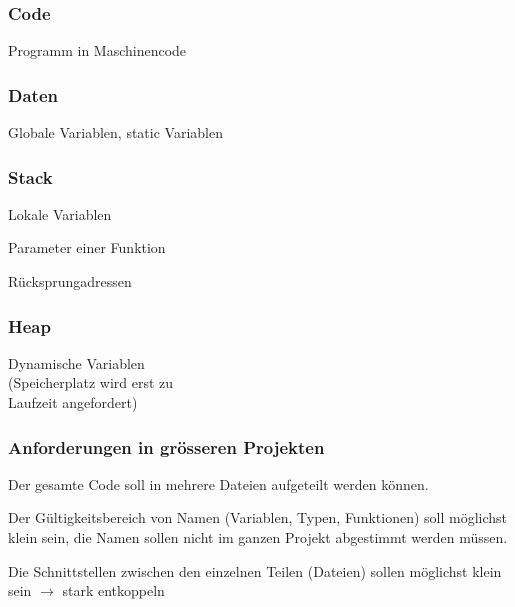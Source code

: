 		\hspace*{1cm}
		\begin{minipage}[t]{10 cm}
			\vspace*{-0.4cm} 
			\subsubsection{Code}
				\begin{compactitem}
					\item Programm in Maschinencode
				\end{compactitem}
			\subsubsection{Daten}
				\begin{compactitem}
					\item Globale Variablen, static Variablen
				\end{compactitem}		
			\subsubsection{Stack}
				\begin{compactitem}
					\item Lokale Variablen
					\item Parameter einer Funktion
					\item Rücksprungadressen
				\end{compactitem}		
			\subsubsection{Heap}
				\begin{compactitem}
					\item Dynamische Variablen\\
					(Speicherplatz wird erst zu\\ Laufzeit angefordert)
				\end{compactitem}		
		\end{minipage}
		\subsubsection{Anforderungen in grösseren Projekten}
			\begin{compactitem}
				\item Der gesamte Code soll in mehrere Dateien aufgeteilt werden können.
				\item Der Gültigkeitsbereich von Namen (Variablen, Typen, Funktionen) soll 
				möglichst klein sein, die Namen sollen nicht im ganzen Projekt abgestimmt
				werden müssen.
				\item Die Schnittstellen zwischen den einzelnen Teilen (Dateien) sollen möglichst
				klein sein $\rightarrow$ stark entkoppeln
			\end{compactitem}
